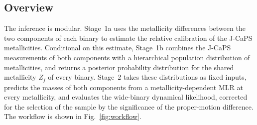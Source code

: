 \documentclass{aa}
\begin{document}
\subsection{Overview}\label{sec:overview}
The inference is modular. Stage~1a uses the metallicity differences between the two components of each binary to estimate the relative calibration of the J-CaPS metallicities. Conditional on this estimate, Stage~1b combines the J-CaPS measurements of both components with a hierarchical population distribution of metallicities, and returns a posterior probability distribution for the shared metallicity $Z_j$ of every binary. Stage~2 takes these distributions as fixed inputs, predicts the masses of both components from a metallicity-dependent MLR at every metallicity, and evaluates the wide-binary dynamical likelihood, corrected for the selection of the sample by the significance of the proper-motion difference. The workflow is shown in Fig.~\ref{fig:workflow}.
\end{document}
